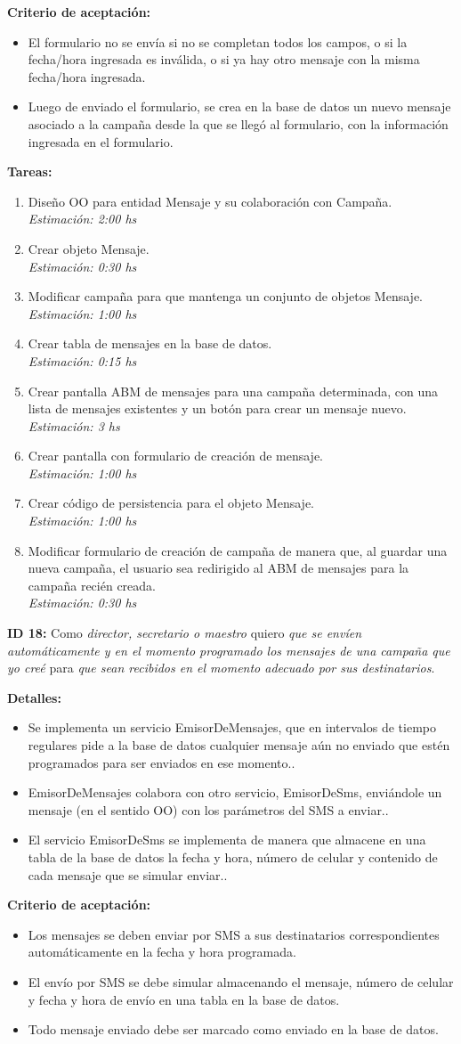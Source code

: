 \documentclass[a4paper, 10pt, twoside]{article}
\newcommand{\sprintstory}[4]{
  \noindent
  \textbf{ID #1:} Como \emph{#2} quiero \emph{#3} para \emph{#4}.
}
\newenvironment{detalles}{
  \textbf{Detalles:}
  \begin{itemize}
}{
  \end{itemize}
}
\newcommand{\detalle}[1] {
  \item #1.
}
\newenvironment{criterios}{
  \textbf{Criterio de aceptación:}
  \begin{itemize}
}{
  \end{itemize}
}
\newcommand{\criterio}[1] {
  \item #1
}
\newenvironment{tasks}{
  \textbf{Tareas:}
  \begin{enumerate}
}{
  \end{enumerate}
}
\newcommand{\task}[2] {
  \item #1.\\
  \emph{Estimación: #2 hs}
}
\begin{document}
\begin{criterios}
  \criterio{El formulario no se envía si no se completan todos los campos, o si la fecha/hora ingresada es inválida, o si ya hay otro mensaje con la misma fecha/hora ingresada.}
  \criterio{Luego de enviado el formulario, se crea en la base de datos un nuevo mensaje asociado a la campaña desde la que se llegó al formulario, con la información ingresada en el formulario.}
\end{criterios}

\begin{tasks}
  \task{Diseño OO para entidad Mensaje y su colaboración con Campaña}{2:00}
  \task{Crear objeto Mensaje}{0:30}
  \task{Modificar campaña para que mantenga un conjunto de objetos Mensaje}{1:00}
  \task{Crear tabla de mensajes en la base de datos}{0:15}
  \task{Crear pantalla ABM de mensajes para una campaña determinada, con una lista de mensajes existentes y un botón para crear un mensaje nuevo}{3}
  \task{Crear pantalla con formulario de creación de mensaje}{1:00}
  \task{Crear código de persistencia para el objeto Mensaje}{1:00}
  \task{Modificar formulario de creación de campaña de manera que, al guardar una nueva campaña, el usuario sea redirigido al ABM de mensajes para la campaña recién creada}{0:30}
\end{tasks}

\sprintstory{18}
            {director, secretario o maestro}
            {que se envíen automáticamente y en el momento programado los mensajes de una campaña que yo creé}
            {que sean recibidos en el momento adecuado por sus destinatarios}

\begin{detalles}
  \detalle{Se implementa un servicio EmisorDeMensajes, que en intervalos de tiempo regulares pide a la base de datos cualquier mensaje aún no enviado que estén programados para ser enviados en ese momento.}
  \detalle{EmisorDeMensajes colabora con otro servicio, EmisorDeSms, enviándole un mensaje (en el sentido OO) con los parámetros del SMS a enviar.}
  \detalle{El servicio EmisorDeSms se implementa de manera que almacene en una tabla de la base de datos la fecha y hora, número de celular y contenido de cada mensaje que se simular enviar.}
\end{detalles}

\begin{criterios}
  \criterio{Los mensajes se deben enviar por SMS a sus destinatarios correspondientes automáticamente en la fecha y hora programada.}
  \criterio{El envío por SMS se debe simular almacenando el mensaje, número de celular y fecha y hora de envío en una tabla en la base de datos.}
  \criterio{Todo mensaje enviado debe ser marcado como enviado en la base de datos.}
\end{criterios}
\end{document}
